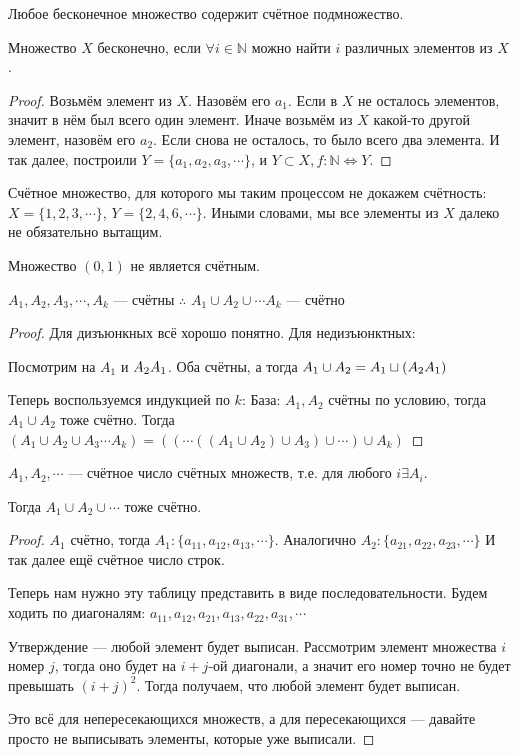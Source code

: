 \begin{theorem}[Лемма]
Любое бесконечное множество содержит счётное подмножество.
\end{theorem}
\begin{definition}
	Множество $X$ бесконечно, если $\forall i \in \mathbb{N}$ можно найти $i$ различных элементов из $X$.
\end{definition}
\begin{proof}
	Возьмём элемент из $X$. Назовём его $a_1$. Если в $X$ не осталось элементов, значит в нём был всего один элемент. Иначе возьмём из $X$ какой-то другой элемент, назовём его $a_2$. Если снова не осталось, то было всего два элемента. И так далее, построили $Y = \{a_1, a_2, a_3, \cdots\}$, и $Y \subset X, f: \mathbb{N} \Leftrightarrow Y$.
\end{proof}
\begin{example}
	Счётное множество, для которого мы таким процессом не докажем счётность: $X = \{1, 2, 3, \cdots\}$, $Y = \{2, 4, 6, \cdots\}$. Иными словами, мы все элементы из $X$ далеко не обязательно вытащим.
\end{example}
\begin{example}
	Множество $(0, 1)$ не является счётным.
\end{example}
\begin{consequence}
$A_1, A_2, A_3, \cdots, A_k$ --- счётны $\therefore$ $A_1 \cup A_2 \cup \cdots A_k$ --- счётно
\end{consequence}
\begin{proof}
    Для дизъюнкных всё хорошо понятно. Для недизъюнктных:

    Посмотрим на $A_1$ и $A_2 \\ A_1$. Оба счётны, а тогда $A_1 \cup A_2 = A_1 \sqcup (A_2 \\ A_1)$

    Теперь воспользуемся индукцией по $k$:
    База: $A_1, A_2$ счётны по условию, тогда $A_1 \cup A_2$ тоже счётно.
    Тогда $(A_1 \cup A_2 \cup A_3 \cdots A_k) = ((\cdots((A_1 \cup A_2) \cup A_3) \cup \cdots) \cup A_k)$
\end{proof}
\begin{lemma}
$A_1, A_2, \cdots$ --- счётное число счётных множеств, т.е. для любого $i \exists A_i$.

Тогда $A_1 \cup A_2 \cup \cdots$ тоже счётно.
\end{lemma}
\begin{proof}
	$A_1$ счётно, тогда $A_1: \{a_{11}, a_{12}, a_{13}, \cdots\}$. 
	Аналогично $A_2: \{a_{21}, a_{22}, a_{23}, \cdots\}$
	И так далее ещё счётное число строк.

	Теперь нам нужно эту таблицу представить в виде последовательности.
	Будем ходить по диагоналям: $a_{11}, a_{12}, a_{21}, a_{13}, a_{22}, a_{31}, \cdots$

	Утверждение --- любой элемент будет выписан. Рассмотрим элемент множества $i$ номер $j$, тогда оно будет на $i+j$-ой диагонали, а значит его номер точно не будет превышать $(i+j)^2$. Тогда получаем, что любой элемент будет выписан.

	Это всё для непересекающихся множеств, а для пересекающихся --- давайте просто не выписывать элементы, которые уже выписали. 
\end{proof}
